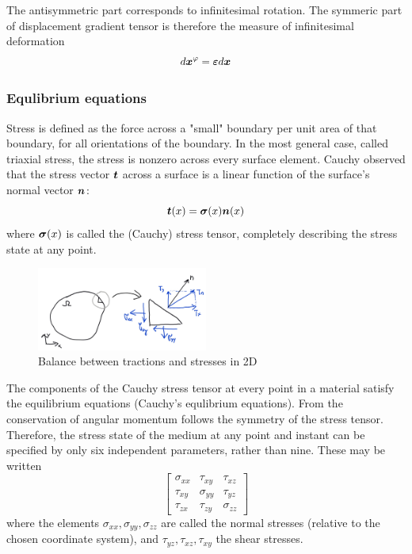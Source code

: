 The antisymmetric part corresponds to infinitesimal rotation. The symmeric part of displacement gradient tensor is therefore the measure of infinitesimal deformation
$$
d\mbox{\boldmath$x$}^\varphi = \mbox{\boldmath$\varepsilon$} d\mbox{\boldmath$x$}
$$
\subsubsection{Equlibrium equations}
Stress is defined as the force across a "small" boundary per unit area of that boundary, for all orientations of the boundary. In the most general case, called triaxial stress, the stress is nonzero across every surface element. Cauchy observed that the stress vector $\mbox{\boldmath$t$}$ across a surface is a linear function of the surface's normal vector $\mbox{\boldmath$n$}$:
$$
\mbox{\boldmath$t$}(x)=\mbox{\boldmath$\sigma$}(x)\mbox{\boldmath$n$}(x)
$$
where $\mbox{\boldmath$\sigma$}(x)$ is called the (Cauchy) stress tensor, completely describing the stress state at any point.
\begin{figure}
  \begin{center}
    \includegraphics[width=0.5\textwidth]{figs/tractionstressrelation.png}
  \end{center}
  \label{fig:tractionstressrelation}
  \caption{Balance between tractions and stresses in 2D}
\end{figure}

The components of the Cauchy stress tensor at every point in a material satisfy the equilibrium equations (Cauchy’s equlibrium equations). From the conservation of angular momentum follows the symmetry of the stress tensor. Therefore, the stress state of the medium at any point and instant can be specified by only six independent parameters, rather than nine. These may be written
$$
\left[
  \begin{array}{ccc}
    \sigma_{xx} & \tau_{xy} & \tau_{xz}\\
    \tau_{xy} & \sigma_{yy} & \tau_{yz}\\
    \tau_{zx} & \tau_{zy} & \sigma_{zz}
  \end{array}
\right] 
$$
where the elements $\sigma_{xx}, \sigma_{yy}, \sigma_{zz}$ are called the normal stresses (relative to the chosen coordinate system), and $\tau_{yz}, \tau_{xz}, \tau_{xy}$ the shear stresses.

